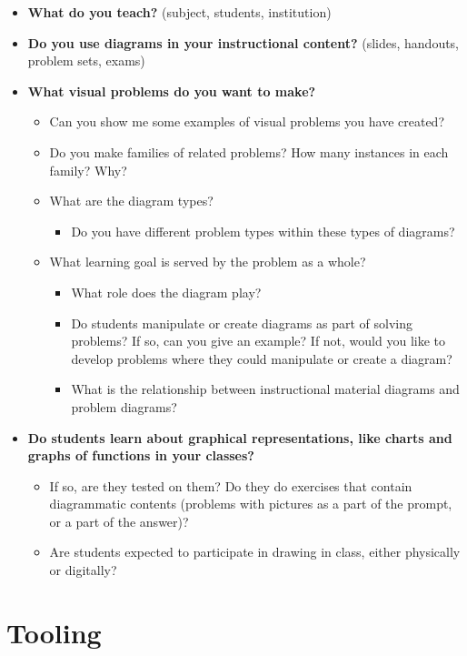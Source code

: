 \begin{itemize}
    \item \textbf{What do you teach?} (subject, students, institution)
    \item \textbf{Do you use diagrams in your instructional content?} (slides, handouts, problem sets, exams)
    \item \textbf{What visual problems do you want to make?}
    \begin{itemize}
        \item Can you show me some examples of visual problems you have created?
        \item Do you make families of related problems? How many instances in each family? Why?
        \item What are the diagram types?
        \begin{itemize}
            \item Do you have different problem types within these types of diagrams?
        \end{itemize}
        \item What learning goal is served by the problem as a whole?
        \begin{itemize}
            \item What role does the diagram play?
            \item Do students manipulate or create diagrams as part of solving problems? If so, can you give an example? If not, would you like to develop problems where they could manipulate or create a diagram?
            \item What is the relationship between instructional material diagrams and problem diagrams?
        \end{itemize}
    \end{itemize}
    \item \textbf{Do students learn about graphical representations, like charts and graphs of functions in your classes?}
    \begin{itemize}
        \item If so, are they tested on them? Do they do exercises that contain diagrammatic contents (problems with pictures as a part of the prompt, or a part of the answer)?
        \item Are students expected to participate in drawing in class, either physically or digitally?
    \end{itemize}
\end{itemize}

\section{Tooling}

